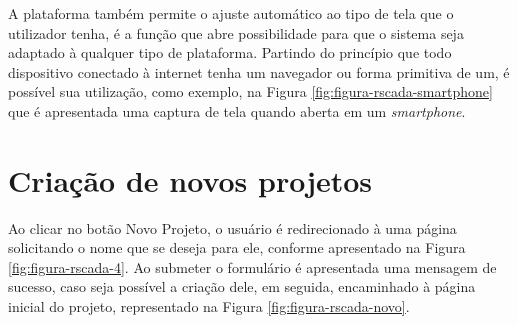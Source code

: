 A plataforma também permite o ajuste automático ao tipo de tela que o utilizador tenha, é a função que abre possibilidade para que o sistema seja adaptado à qualquer tipo de plataforma. Partindo do princípio que todo dispositivo conectado à internet tenha um navegador ou forma primitiva de um, é possível sua utilização, como exemplo, na Figura \ref{fig:figura-rscada-smartphone} que é apresentada uma captura de tela quando aberta em um \textit{smartphone}.

    	\begin{figure}[!h]
    	\end{figure}
    	
\section{Criação de novos projetos}
\label{sec:criacao-projetos}
Ao clicar no botão Novo Projeto, o usuário é redirecionado à uma página solicitando o nome que se deseja para ele, conforme apresentado na Figura \ref{fig:figura-rscada-4}. Ao submeter o formulário é apresentada uma mensagem de sucesso, caso seja possível a criação dele, em seguida, encaminhado à página inicial do projeto, representado na Figura \ref{fig:figura-rscada-novo}. 

